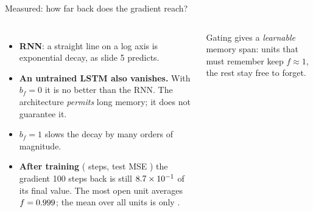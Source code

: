 \documentclass[aspectratio=169,10pt]{beamer}
\begin{document}
\begin{frame}{Measured: how far back does the gradient reach?}
\begin{columns}[T,onlytextwidth]
\vspace{1.5mm}
\begin{itemize}\footnotesize
  \item \textbf{RNN}: a straight line on a log axis is exponential decay, as slide 5
        predicts.
  \item \textbf{An untrained LSTM also vanishes.} With $b_f=0$ it is no better than the RNN.
        The architecture \emph{permits} long memory; it does not guarantee it.
  \item \textbf{$b_f=1$} slows the decay by many orders of magnitude.
  \item \textbf{After training} (\gradTrainedSteps{} steps, test MSE \gradTrainedMse) the gradient 100
        steps back is still $8.7\times10^{-1}$ of its final value. The most open unit
        averages $f=0.999$; the mean over all units is only \gradTrainedFmean.
\end{itemize}
{\footnotesize Gating gives a \emph{learnable} memory span: units that must remember keep
$f\approx1$, the rest stay free to forget.}
\end{columns}
\end{frame}
\end{document}
